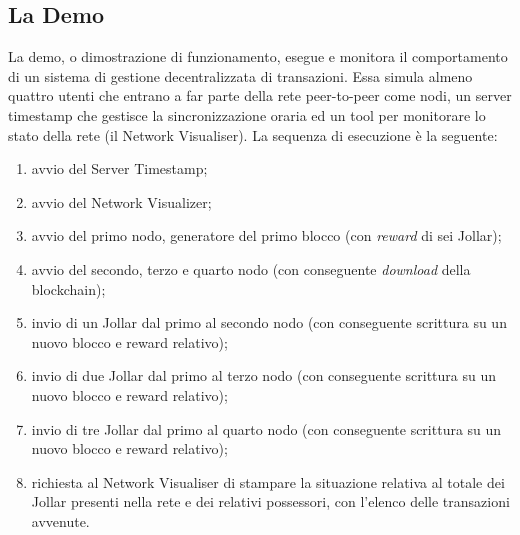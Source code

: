 \subsection{La Demo}
La demo, o dimostrazione di funzionamento, esegue e monitora il comportamento di un sistema di gestione decentralizzata di transazioni. Essa simula almeno quattro utenti che entrano a far parte della rete peer-to-peer come nodi, un server timestamp che gestisce la sincronizzazione oraria ed un tool per monitorare lo stato della rete (il Network Visualiser).
La sequenza di esecuzione è la seguente:
\begin{enumerate}
 \item avvio del Server Timestamp;
 \item avvio del Network Visualizer;
 \item avvio del primo nodo, generatore del primo blocco (con \textit{reward} di sei Jollar);
 \item avvio del secondo, terzo e quarto nodo (con conseguente \textit{download} della blockchain);
 \item invio di un Jollar dal primo al secondo nodo (con conseguente scrittura su un nuovo blocco e reward relativo);
 \item invio di due Jollar dal primo al terzo nodo (con conseguente scrittura su un nuovo blocco e reward relativo);
 \item invio di tre Jollar dal primo al quarto nodo (con conseguente scrittura su un nuovo blocco e reward relativo);
 \item richiesta al Network Visualiser di stampare la situazione relativa al totale dei Jollar presenti nella rete e dei relativi possessori, con l'elenco delle transazioni avvenute.
\end{enumerate}
